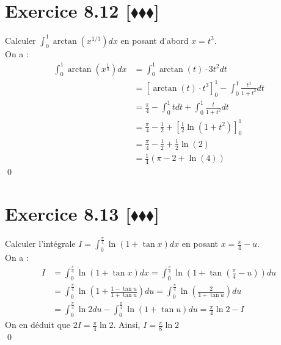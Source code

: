 \documentclass[10pt]{article}
\begin{document}
\section*{Exercice 8.12 [$\blacklozenge\blacklozenge\blacklozenge$]}
\begin{tcolorbox}[enhanced, width=7in, center, size=fbox, fontupper=\large, drop shadow southwest]
    Calculer $\int_0^1{\arctan(x^{1/3})dx}$ en posant d'abord $x=t^3$.\\
    On a :
    \begin{align*}
        \int_0^1{\arctan(x^{\frac{1}{3}})dx}&=\int_0^1{\arctan(t)\cdot3t^2dt}\\
        &=\left[\arctan(t)\cdot t^3\right]_0^1 - \int_0^1{\frac{t^3}{1+t^2} dt}\\
        &=\frac{\pi}{4} - \int_0^1{tdt}+\int_0^1{\frac{t}{1+t^2}dt}\\
        &=\frac{\pi}{4} - \frac{1}{2} + \left[\frac{1}{2}\ln(1+t^2)\right]_0^1\\
        &=\frac{\pi}{4} - \frac{1}{2} + \frac{1}{2}\ln(2)\\
        &=\frac{1}{4}\left(\pi - 2 + \ln(4)\right)
    \end{align*}
    \qed
\end{tcolorbox}


\section*{Exercice 8.13 [$\blacklozenge\blacklozenge\blacklozenge$]}
\begin{tcolorbox}[enhanced, width=7in, center, size=fbox, fontupper=\large, drop shadow southwest]
    Calculer l'intégrale $I = \int_0^{\frac{\pi}{4}}{\ln(1+\tan x)dx}$ en posant $x=\frac{\pi}{4}-u$.\\
    On a :
    \begin{align*}
        I &= \int_0^{\frac{\pi}{4}}{\ln(1+\tan x)dx} = \int_{0}^{\frac{\pi}{4}}{\ln\left(1+\tan\left(\frac{\pi}{4}-u\right)\right)du}\\
        &=\int^{\frac{\pi}{4}}_0{\ln\left(1+\frac{1-\tan u}{1+\tan u}\right)du}=\int_0^{\frac{\pi}{4}}{\ln\left(\frac{2}{1+\tan u}\right)du}\\
        &=\int_0^{\frac{\pi}{4}}{\ln2du}-\int_0^{\frac{\pi}{4}}{\ln(1+\tan u)du} = \frac{\pi}{4}\ln2 - I
    \end{align*}
    On en déduit que $2I = \frac{\pi}{4}\ln2$. Ainsi, $I=\frac{\pi}{8}\ln2$\\
    \qed
\end{tcolorbox}

\end{document}
